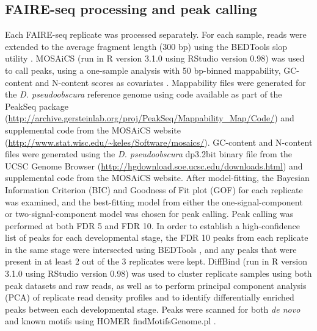 \subsection{FAIRE-seq processing and peak calling}
Each FAIRE-seq replicate was processed separately. For each sample, reads were extended to the average fragment length (300 bp) using the BEDTools slop utility \citep{quinlan_bedtools:_2010}. MOSAiCS (run in R version 3.1.0 using RStudio version 0.98) was used to call peaks, using a one-sample analysis with 50 bp-binned mappability, GC-content and N-content scores as covariates \citep{chung_mosaics_2012}. Mappability files were generated for the \emph{D. pseudoobscura} reference genome using code available as part of the PeakSeq package (\url{http://archive.gersteinlab.org/proj/PeakSeq/Mappability_Map/Code/}) \citep{rozowsky_peakseq_2009} and supplemental code from the MOSAiCS website (\url{http://www.stat.wisc.edu/~keles/Software/mosaics/}). GC-content and N-content files were generated using the \emph{D. pseudoobscura} dp3.2bit binary file from the UCSC Genome Browser (\url{http://hgdownload.soe.ucsc.edu/downloads.html}) and supplemental code from the MOSAiCS website. After model-fitting, the Bayesian Information Criterion (BIC) and Goodness of Fit plot (GOF) for each replicate was examined, and the best-fitting model from either the one-signal-component or two-signal-component model was chosen for peak calling. Peak calling was performed at both FDR 5 and FDR 10. In order to establish a high-confidence list of peaks for each developmental stage, the FDR 10 peaks from each replicate in the same stage were intersected using BEDTools \citep{quinlan_bedtools:_2010}, and any peaks that were present in at least 2 out of the 3 replicates were kept. DiffBind (run in R version 3.1.0 using RStudio version 0.98) was used to cluster replicate samples using both peak datasets and raw reads, as well as to perform principal component analysis (PCA) of replicate read density profiles and to identify differentially enriched peaks between each developmental stage. Peaks were scanned for both \emph{de novo} and known motifs using HOMER findMotifsGenome.pl \citep{heinz_simple_2010}.

